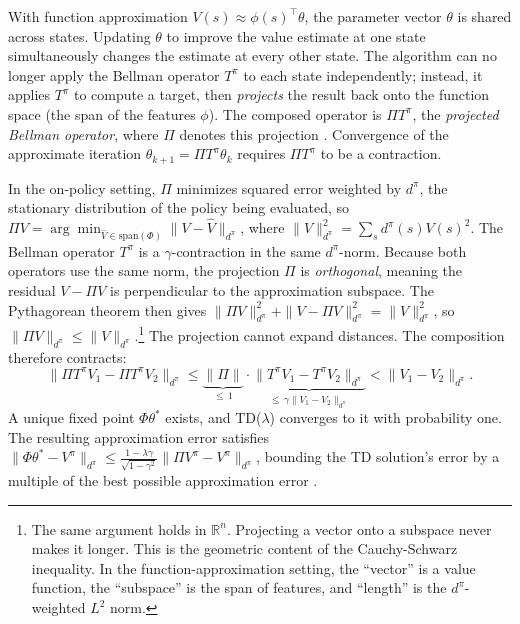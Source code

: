 With function approximation $V(s) \approx \phi(s)^\top \theta$, the parameter vector $\theta$ is shared across states. Updating $\theta$ to improve the value estimate at one state simultaneously changes the estimate at every other state. The algorithm can no longer apply the Bellman operator $T^\pi$ to each state independently; instead, it applies $T^\pi$ to compute a target, then \emph{projects} the result back onto the function space (the span of the features $\phi$). The composed operator is $\Pi T^\pi$, the \textit{projected Bellman operator}, where $\Pi$ denotes this projection \citep{tsitsiklis1997}. Convergence of the approximate iteration $\theta_{k+1} = \Pi T^\pi \theta_k$ requires $\Pi T^\pi$ to be a contraction.

In the on-policy setting, $\Pi$ minimizes squared error weighted by $d^\pi$, the stationary distribution of the policy being evaluated, so $\Pi V = \arg\min_{\hat{V} \in \text{span}(\Phi)} \|V - \hat{V}\|_{d^\pi}$, where $\|V\|_{d^\pi}^2 = \sum_s d^\pi(s) V(s)^2$. The Bellman operator $T^\pi$ is a $\gamma$-contraction in the same $d^\pi$-norm. Because both operators use the same norm, the projection $\Pi$ is \emph{orthogonal}, meaning the residual $V - \Pi V$ is perpendicular to the approximation subspace. The Pythagorean theorem then gives $\|\Pi V\|_{d^\pi}^2 + \|V - \Pi V\|_{d^\pi}^2 = \|V\|_{d^\pi}^2$, so $\|\Pi V\|_{d^\pi} \leq \|V\|_{d^\pi}$.\footnote{The same argument holds in $\mathbb{R}^n$. Projecting a vector onto a subspace never makes it longer. This is the geometric content of the Cauchy-Schwarz inequality. In the function-approximation setting, the ``vector'' is a value function, the ``subspace'' is the span of features, and ``length'' is the $d^\pi$-weighted $L^2$ norm.} The projection cannot expand distances. The composition therefore contracts:
\begin{equation}
\|\Pi T^\pi V_1 - \Pi T^\pi V_2\|_{d^\pi} \leq \underbrace{\|\Pi\|}_{\leq\, 1} \cdot \underbrace{\|T^\pi V_1 - T^\pi V_2\|_{d^\pi}}_{\leq\, \gamma \|V_1 - V_2\|_{d^\pi}} < \|V_1 - V_2\|_{d^\pi}.
\label{eq:on_policy_contraction}
\end{equation}
A unique fixed point $\Phi \theta^*$ exists, and TD($\lambda$) converges to it with probability one. The resulting approximation error satisfies $\|\Phi \theta^* - V^\pi\|_{d^\pi} \leq \frac{1-\lambda\gamma}{\sqrt{1-\gamma^2}} \|\Pi V^\pi - V^\pi\|_{d^\pi}$, bounding the TD solution's error by a multiple of the best possible approximation error \citep[Theorem~1]{tsitsiklis1997}.

